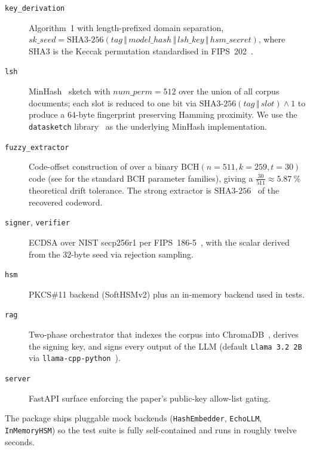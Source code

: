 \begin{description}
  \item[\texttt{key\_derivation}]  Algorithm~1 with length\nobreakdash-prefixed
    domain separation, $\mathit{sk\_seed} =
    \mathrm{SHA3\text{-}256}(\mathit{tag} \,\Vert\,
    \mathit{model\_hash} \,\Vert\, \mathit{lsh\_key} \,\Vert\,
    \mathit{hsm\_secret})$, where SHA3 is the Keccak permutation
    standardised in FIPS~202~\cite{nist-fips-202}.
  \item[\texttt{lsh}]  MinHash~\cite{broder1997minhash} sketch with
    $\mathit{num\_perm}=512$ over the union of all corpus documents;
    each slot is reduced to one bit via
    $\mathrm{SHA3\text{-}256}(\mathit{tag} \,\Vert\,
    \mathit{slot}) \wedge 1$ to produce a 64\nobreakdash-byte
    fingerprint preserving Hamming proximity.  We use the
    \texttt{datasketch} library~\cite{datasketch} as the underlying
    MinHash implementation.
  \item[\texttt{fuzzy\_extractor}]  Code\nobreakdash-offset
    construction of \cite{dodis2008fuzzy} over a binary
    $\mathrm{BCH}(n=511, k=259, t=30)$ code (see
    \cite{macwilliams1977ecc} for the standard BCH parameter
    families), giving a $\frac{30}{511} \approx \SI{5.87}{\percent}$
    theoretical drift tolerance.  The strong extractor is
    $\mathrm{SHA3\text{-}256}$~\cite{nist-fips-202} of the recovered
    codeword.
  \item[\texttt{signer}, \texttt{verifier}]  ECDSA over NIST
    secp256r1 per FIPS~186-5~\cite{nist-fips-186-5}, with the
    scalar derived from the 32\nobreakdash-byte seed via rejection
    sampling.
  \item[\texttt{hsm}]  PKCS\#11 backend (SoftHSMv2) plus an
    in\nobreakdash-memory backend used in tests.
  \item[\texttt{rag}]  Two\nobreakdash-phase orchestrator that
    indexes the corpus into ChromaDB~\cite{chromadb}, derives the
    signing key, and signs every output of the LLM (default
    \texttt{Llama 3.2 2B} via
    \texttt{llama\nobreakdash-cpp\nobreakdash-python}~\cite{llama-cpp-python}).
  \item[\texttt{server}]  FastAPI surface enforcing the paper's
    public\nobreakdash-key allow\nobreakdash-list gating.
\end{description}

The package ships pluggable mock backends (\texttt{HashEmbedder},
\texttt{EchoLLM}, \texttt{InMemoryHSM}) so the test suite is fully
self\nobreakdash-contained and runs in roughly twelve seconds.

